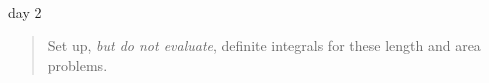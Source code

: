 \documentclass[11pt,fleqn]{article}
\begin{document}
\renewcommand{\headrulewidth}{0pt}
\newcommand{\blank}[1]{\rule{#1}{0.75pt}}
\newcommand{\bc}{\begin{center}}
\newcommand{\ec}{\end{center}}
\renewcommand{\d}{\displaystyle}

\vspace*{-0.7in}

\begin{center}
  \large
  \\
  day 2
 
\end{center}


\begin{quote}
Set up, \emph{but do not evaluate}, definite integrals for these length and area problems.
\end{quote}
\bigskip
\end{document}
